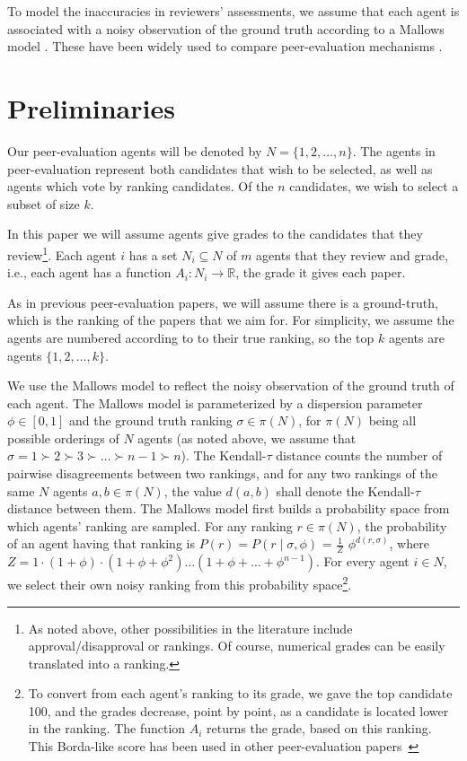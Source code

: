 \documentclass[letterpaper]{article} %
\begin{document}
To model the inaccuracies in reviewers’ assessments, we assume that each agent is associated with a noisy observation of the ground truth according to a Mallows model \cite{Mal57}. These have been widely used to compare peer-evaluation mechanisms \cite{ALMRW16,ALMRW19,MTZ20,LMTZ23}.

\section{Preliminaries}\label{prelim}

Our peer-evaluation agents will be denoted by $N=\{1,2,\ldots,n\}$. The agents in peer-evaluation represent both candidates that wish to be selected, as well as agents which vote by ranking candidates. Of the $n$ candidates, we wish to select a subset of size $k$.

In this paper we will assume agents give grades to the candidates that they review\footnote{As noted above, other possibilities in the literature include approval/disapproval or rankings. Of course, numerical grades can be easily translated into a ranking.}. Each agent $i$ has a set $N_{i}\subseteq N$ of $m$ agents that they review and grade, i.e., each agent has a function $A_{i}:N_{i}\rightarrow \mathbb{R}$, the grade it gives each paper.

As in previous peer-evaluation papers, we will assume there is a ground-truth, which is the ranking of the papers that we aim for. For simplicity, we assume the agents are numbered according to to their true ranking, so the top $k$ agents are agents $\{1,2,\ldots,k\}$.

We use the Mallows model to reflect the noisy observation of the ground truth of each agent. The Mallows model is parameterized by a dispersion parameter $\phi\in [0,1]$ and the ground truth ranking $\sigma\in\pi(N)$, for $\pi(N)$ being all possible orderings of $N$ agents (as noted above, we assume that $\sigma=1\succ 2\succ 3\succ\ldots\succ n-1\succ n$). The Kendall-$\tau$ distance counts the number of pairwise disagreements between two rankings, and for any two rankings of the same $N$ agents $a,b\in\pi(N)$, the value $d(a,b)$ shall denote the Kendall-$\tau$ distance between them. The Mallows model first builds a probability space from which agents' ranking are sampled. For any ranking $r\in\pi(N)$, the probability of an agent having that ranking is $P(r) = P(r \mid \sigma,\phi)$ = $\frac{1}{Z}$ $\phi^{d(r,\sigma)}$, where $Z = 1\cdot(1+\phi)\cdot(1+\phi+\phi^2) \ldots (1+ \phi+ \ldots +\phi^{n-1})$. For every agent $i\in N$, we select their own noisy ranking from this probability space\footnote{To convert from each agent's ranking to its grade, we gave the top candidate 100, and the grades decrease, point by point, as a candidate is located lower in the ranking. The function $A_{i}$ returns the grade, based on this ranking. This Borda-like score has been used in other peer-evaluation papers~\cite{ALMRW16,ALMRW19}}.
\end{document}

